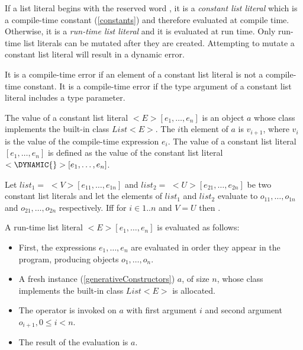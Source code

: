 \documentclass{article}
\begin{document}
\LMHash{}
If a list literal begins with the reserved word \CONST{}, it is a {\em constant list literal} which is a compile-time constant (\ref{constants}) and therefore evaluated at compile time.
Otherwise, it is a {\em run-time list literal} and it is evaluated at run time.
Only run-time list literals can be mutated
after they are created.
Attempting to mutate a constant list literal will result in a dynamic error.

\LMHash{}
It is a compile-time error if an element of a constant list literal is not a compile-time constant.
It is a compile-time error if the type argument of a constant list literal includes a type parameter.

\LMHash{}
The value of a constant list literal \CONST{} $<E>[e_1, \ldots, e_n]$ is an object $a$ whose class implements the built-in class $List<E>$.
The $i$th element of $a$ is $v_{i+1}$, where $v_i$ is the value of the compile-time expression $e_i$.
The value of a constant list literal \CONST{} $[e_1, \ldots, e_n]$ is defined as the value of the constant list literal \CONST{}$ <\DYNAMIC{}>[e_1, \ldots, e_n]$.

\LMHash{}
Let $list_1 =$ \CONST{} $<V>[e_{11}, \ldots, e_{1n}]$ and $list_2 =$ \CONST{} $<U>[e_{21}, \ldots, e_{2n}]$ be two constant list literals and let the elements of $list_1$ and $list_2$ evaluate to $o_{11}, \ldots, o_{1n}$ and $o_{21}, \ldots, o_{2n}$ respectively.
If{}f  for $i \in 1 .. n$ and $V = U$ then .


\LMHash{}
A run-time list literal $<E>[e_1, \ldots, e_n]$ is evaluated as follows:
\begin{itemize}
\item
First, the expressions $e_1, \ldots, e_n$ are evaluated in order they appear in the program, producing objects $o_1, \ldots, o_n$.
\item A fresh instance (\ref{generativeConstructors}) $a$, of size $n$, whose class implements the built-in class $List<E>$ is allocated.
\item
The operator \code{[]=} is invoked on $a$ with first argument $i$ and second argument
$o_{i+1}, 0 \le i < n$.
\item
The result of the evaluation is $a$.
\end{itemize}
\end{document}

